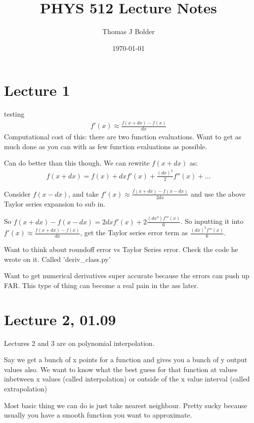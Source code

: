 \documentclass[12pt]{article}
\author{Thomas J Bolder}
\date{\today}
\title{PHYS 512 Lecture Notes}
\begin{document}
\maketitle
\newpage


\section{Lecture 1}
testing
\begin{eqnarray}
    f'(x) \approx \frac{f(x+dx)-f(x)}{dx}
\end{eqnarray}
Computational cost of this: there are two function evaluations. Want to get as much done as you can with as few function evaluations as possible.

Can do better than this though. We can rewrite $f(x+dx)$ as:
\begin{eqnarray}
    f(x+dx) = f(x) +dx f'(x) + \frac{(dx)^2}{2} f''(x) + ...
\end{eqnarray}

Consider $f(x-dx)$, and take $f'(x) \approx \frac{f(x+dx)-f(x-dx)}{2dx}$ and use the above Taylor series expansion to sub in.

So $f(x+dx) - f(x-dx) = 2dx f'(x) + 2\frac{(dx^3)f'''(x)}{6}$.
So inputting it into $f'(x) \approx \frac{f(x+dx)-f(x)}{dx}$, get the Taylor series error term as $\frac{(dx)^2 f'''(x)}{6}$.

Want to think about roundoff error vs Taylor Series error. Check the code he wrote on it. Called 'deriv\_class.py'

Want to get numerical derivatives super accurate because the errors can push up FAR. This type of thing can become a real pain in the ass later.



\section{Lecture 2, 01.09}

Lectures 2 and 3 are on polynomial interpolation.

Say we get a bunch of x points for a function and gives you a bunch of y output values also. 
We want to know what the best guess for that function at values inbetween x values (called interpolation) or outside of the x value interval (called extrapolation)

Most basic thing we can do is just take nearest neighbour. Pretty sucky because usually you have a smooth function you want to approximate.
\end{document}
